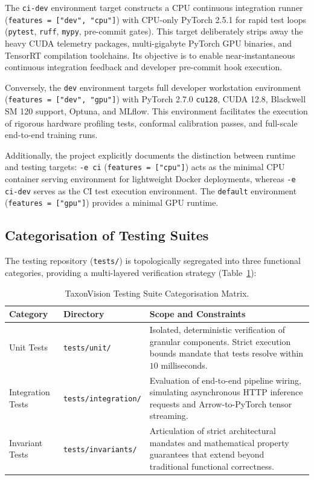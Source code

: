 The \texttt{ci-dev} environment target constructs a CPU continuous integration runner (\texttt{features = ["dev", "cpu"]}) with CPU-only PyTorch 2.5.1 for rapid test loops (\texttt{pytest}, \texttt{ruff}, \texttt{mypy}, pre-commit gates). This target deliberately strips away the heavy CUDA telemetry packages, multi-gigabyte PyTorch GPU binaries, and TensorRT compilation toolchains. Its objective is to enable near-instantaneous continuous integration feedback and developer pre-commit hook execution.

Conversely, the \texttt{dev} environment targets full developer workstation environment (\texttt{features = ["dev", "gpu"]}) with PyTorch 2.7.0 \texttt{cu128}, CUDA 12.8, Blackwell SM 120 support, Optuna, and MLflow. This environment facilitates the execution of rigorous hardware profiling tests, conformal calibration passes, and full-scale end-to-end training runs.

Additionally, the project explicitly documents the distinction between runtime and testing targets: \texttt{-e ci} (\texttt{features = ["cpu"]}) acts as the minimal CPU container serving environment for lightweight Docker deployments, whereas \texttt{-e ci-dev} serves as the CI test execution environment. The \texttt{default} environment (\texttt{features = ["gpu"]}) provides a minimal GPU runtime.

\subsection{Categorisation of Testing Suites}

The testing repository (\texttt{tests/}) is topologically segregated into three functional categories, providing a multi-layered verification strategy (Table~\ref{tab:test_categories}):

\begin{table}[htbp]
\centering
\caption{TaxonVision Testing Suite Categorisation Matrix.}
\label{tab:test_categories}
\begin{tabularx}{\textwidth}{@{}l l X@{}}
\toprule
\textbf{Category} & \textbf{Directory} & \textbf{Scope and Constraints} \\
\midrule
Unit Tests & \texttt{tests/unit/} & Isolated, deterministic verification of granular components. Strict execution bounds mandate that tests resolve within $10$ milliseconds. \\
Integration Tests & \texttt{tests/integration/} & Evaluation of end-to-end pipeline wiring, simulating asynchronous HTTP inference requests and Arrow-to-PyTorch tensor streaming. \\
Invariant Tests & \texttt{tests/invariants/} & Articulation of strict architectural mandates and mathematical property guarantees that extend beyond traditional functional correctness. \\
\bottomrule
\end{tabularx}
\end{table}

